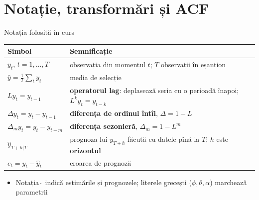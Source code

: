 \section{Notație, transformări și ACF}

\begin{frame}{Notația folosită în curs}
\itemsize{\footnotesize}
\begin{center}
\footnotesize
\begin{tabular}{>{\raggedright\arraybackslash}p{3.2cm}>{\raggedright\arraybackslash}p{8.8cm}}
\toprule
\textbf{Simbol} & \textbf{Semnificație} \\
\midrule
$y_t$, $t = 1, \ldots, T$ & observația din momentul $t$; $T$ observații în eșantion \\
$\bar y = \frac1T \sum_t y_t$ & media de selecție \\
$L y_t = y_{t-1}$ & \textbf{operatorul lag}: deplasează seria cu o perioadă înapoi; $L^k y_t = y_{t-k}$ \\
$\Delta y_t = y_t - y_{t-1}$ & \textbf{diferența de ordinul întîi}, $\Delta = 1 - L$ \\
$\Delta_m y_t = y_t - y_{t-m}$ & \textbf{diferența sezonieră}, $\Delta_m = 1 - L^m$ \\
$\hat y_{T+h|T}$ & prognoza lui $y_{T+h}$ făcută cu datele pînă la $T$; $h$ este \textbf{orizontul} \\
$e_t = y_t - \hat y_t$ & eroarea de prognoză \\
\bottomrule
\end{tabular}
\end{center}
\begin{itemize}
    \item Notația $\hat{\ }$ indică estimările și prognozele; literele grecești ($\phi, \theta, \alpha$) marchează parametrii
\end{itemize}
\end{frame}


